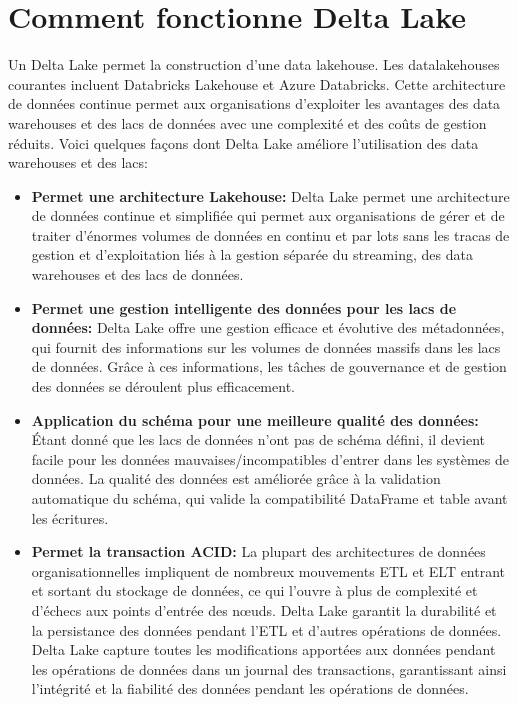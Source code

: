 \section{Comment fonctionne Delta Lake}
Un Delta Lake permet la construction d'une data lakehouse. Les datalakehouses courantes incluent Databricks Lakehouse et Azure Databricks. Cette architecture de données continue permet aux organisations d'exploiter les avantages des data warehouses et des lacs de données avec une complexité et des coûts de gestion réduits. Voici quelques façons dont Delta Lake améliore l'utilisation des data warehouses et des lacs:
\begin{itemize}
    \item \textbf{Permet une architecture Lakehouse:} Delta Lake permet une architecture de données continue et simplifiée qui permet aux organisations de gérer et de traiter d'énormes volumes de données en continu et par lots sans les tracas de gestion et d'exploitation liés à la gestion séparée du streaming, des data warehouses et des lacs de données.
    \item \textbf{Permet une gestion intelligente des données pour les lacs de données:} Delta Lake offre une gestion efficace et évolutive des métadonnées, qui fournit des informations sur les volumes de données massifs dans les lacs de données. Grâce à ces informations, les tâches de gouvernance et de gestion des données se déroulent plus efficacement.
    \item \textbf{Application du schéma pour une meilleure qualité des données:} Étant donné que les lacs de données n'ont pas de schéma défini, il devient facile pour les données mauvaises/incompatibles d'entrer dans les systèmes de données. La qualité des données est améliorée grâce à la validation automatique du schéma, qui valide la compatibilité DataFrame et table avant les écritures.
    \item \textbf{Permet la transaction ACID:} La plupart des architectures de données organisationnelles impliquent de nombreux mouvements ETL et ELT entrant et sortant du stockage de données, ce qui l'ouvre à plus de complexité et d'échecs aux points d'entrée des nœuds. Delta Lake garantit la durabilité et la persistance des données pendant l'ETL et d'autres opérations de données. Delta Lake capture toutes les modifications apportées aux données pendant les opérations de données dans un journal des transactions, garantissant ainsi l'intégrité et la fiabilité des données pendant les opérations de données.
\end{itemize}

